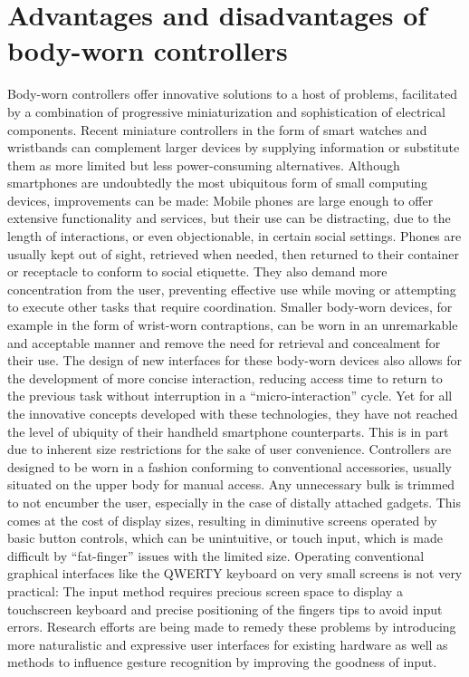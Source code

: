 \documentclass{sigchi}
\begin{document}
\section{Advantages and disadvantages of body-worn controllers}
Body-worn controllers offer innovative solutions to a host of problems, facilitated by a combination of progressive miniaturization and sophistication of electrical components. Recent miniature controllers in the form of smart watches and wristbands can complement larger devices by supplying information or substitute them as more limited but less power-consuming alternatives. \cite{motion-ui} Although smartphones are undoubtedly the most ubiquitous form of small computing devices, improvements can be made: Mobile phones are large enough to offer extensive functionality and services, but their use can be distracting, due to the length of interactions, or even objectionable, in certain social settings. Phones are usually kept out of sight, retrieved when needed, then returned to their container or receptacle to conform to social etiquette. They also demand more concentration from the user, preventing effective use while moving or attempting to execute other tasks that require coordination. Smaller body-worn devices, for example in the form of wrist-worn contraptions, can be worn in an unremarkable and acceptable manner and remove the need for retrieval and concealment for their use. The design of new interfaces for these body-worn devices also allows for the development of more concise interaction, reducing access time to return to the previous task without interruption in a “micro-interaction” cycle. \cite{microinteractions}
Yet for all the innovative concepts developed with these technologies, they have not reached the level of ubiquity of their handheld smartphone counterparts.
This is in part due to inherent size restrictions for the sake of user convenience. Controllers are designed to be worn in a fashion conforming to conventional accessories, usually situated on the upper body for manual access. Any unnecessary bulk is trimmed to not encumber the user, especially in the case of distally attached gadgets. This comes at the cost of display sizes, resulting in diminutive screens operated by basic button controls, which can be unintuitive, or touch input, which is made difficult by ``fat-finger'' issues with the limited size. Operating conventional graphical interfaces like the QWERTY keyboard on very small screens is not very practical: The input method requires precious screen space to display a touchscreen keyboard and precise positioning of the fingers tips to avoid input errors. \cite{vogel7} Research efforts are being made to remedy these problems by introducing more naturalistic and expressive user interfaces for existing hardware as well as methods to influence gesture recognition by improving the goodness of input. \cite{motion-ui, vogel7} %
\end{document}
